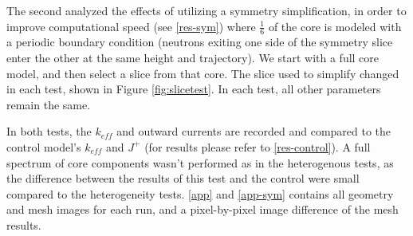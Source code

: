 

The second analyzed the effects of utilizing a symmetry simplification, in order to improve computational speed (see \autoref{res-sym}) where $\frac{1}{6}$ of the core is modeled with a periodic boundary condition (neutrons exiting one side of the symmetry slice enter the other at the same height and trajectory).  We start with a full core model, and then select a slice from that core.  The slice used to simplify changed in each test, shown in Figure \ref{fig:slicetest}.  In each test, all other parameters remain the same.



In both tests, the $k_{eff}$ and outward currents are recorded and compared to the control model's $k_{eff}$ and $J^+$ (for results please refer to \autoref{res-control}).  A full spectrum of core components wasn't performed as in the heterogenous tests, as the difference between the results of this test and the control were small compared to the heterogeneity tests.  \autoref{app} and \autoref{app-sym} contains all geometry and mesh images for each run, and a pixel-by-pixel image difference of the mesh results.